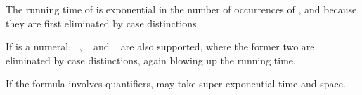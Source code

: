 \begin{isabellebody}
\begin{isamarkuptext}
\begin{warn} The running time of  is exponential in the number
  of occurrences of ,  and
   because they are first eliminated by case distinctions.

If  is a numeral, ~, ~ and
~ are also supported, where the former two are eliminated
by case distinctions, again blowing up the running time.

If the formula involves quantifiers,  may take
super-exponential time and space.
\end{warn}%
\end{isamarkuptext}%
\isamarkuptrue%
\isamarkupfalse%
\end{isabellebody}%
